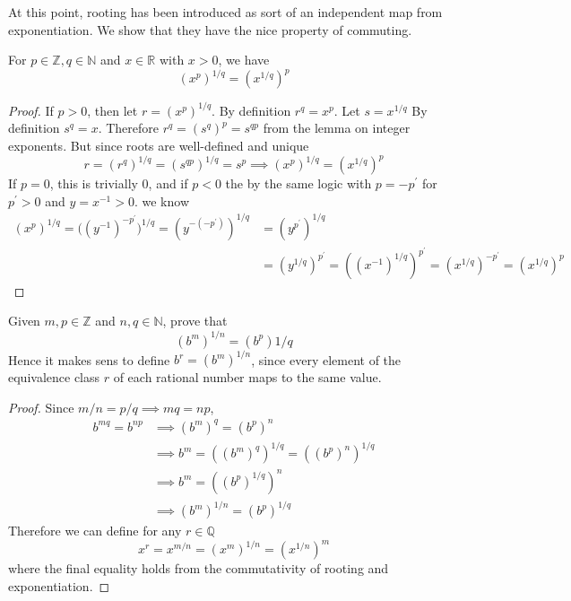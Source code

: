   At this point, rooting has been introduced as sort of an independent map from exponentiation. We show that they have the nice property of commuting. 

  \begin{lemma}
    For $p \in \mathbb{Z}, q \in \mathbb{N}$ and $x \in \mathbb{R}$ with $x > 0$, we have 
    \begin{equation}
      (x^{p})^{1/q} = (x^{1/q})^p
    \end{equation}
  \end{lemma}
  \begin{proof}
    If $p > 0$, then let $r = (x^p)^{1/q}$. By definition $r^q = x^p$. Let $s = x^{1/q}$ By definition $s^q = x$. Therefore $r^q = (s^q)^p = s^{qp}$ from the lemma on integer exponents. But since roots are well-defined and unique 
    \begin{equation}
      r = (r^q)^{1/q} = (s^{qp})^{1/q} = s^p \implies (x^p)^{1/q} = (x^{1/q})^p
    \end{equation}
    If $p = 0$, this is trivially $0$, and if $p < 0$ the by the same logic with $p = -p^\prime$ for $p^\prime > 0$ and $y = x^{-1} > 0$. we know 
    \begin{align}
      (x^p)^{1/q} = \big( (y^{-1})^{-p^\prime} \big)^{1/q} = (y^{-(-p^\prime)})^{1/q} & = (y^{p^\prime})^{1/q} \\ 
                         & = (y^{1/q})^{p^\prime} = ((x^{-1})^{1/q})^{p^\prime} = (x^{1/q})^{-p^\prime} = (x^{1/q})^p
    \end{align}
  \end{proof}

  \begin{theorem}
    Given $m, p \in \mathbb{Z}$ and $n, q \in \mathbb{N}$, prove that 
    \begin{equation}
      (b^m)^{1/n} = (b^p){1/q}
    \end{equation}
    Hence it makes sens to define $b^r = (b^m)^{1/n}$, since every element of the equivalence class $r$ of each rational number maps to the same value. 
  \end{theorem} 
  \begin{proof}
    Since $m/n = p/q \implies mq = np$, 
    \begin{align}
      b^{mq} = b^{np} & \implies (b^m)^q = (b^p)^n \\
                      & \implies b^m = ((b^m)^q)^{1/q} = ((b^p)^n)^{1/q} \\
                      & \implies b^m = ((b^p)^{1/q})^n \\
                      & \implies (b^m)^{1/n} = (b^p)^{1/q}
    \end{align}
    Therefore we can define for any $r \in \mathbb{Q}$ 
    \begin{equation}
      x^r = x^{m/n} = (x^{m})^{1/n} = (x^{1/n})^m
    \end{equation}
    where the final equality holds from the commutativity of rooting and exponentiation. 
  \end{proof}

